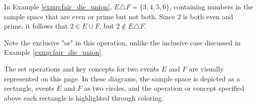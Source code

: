 \begin{exmp}
	In Example \autoref{exmp:fair_die_union}, \( E \triangle F = \{ 3, 4, 5, 6 \} \),
	containing numbers in the sample space that are even or prime but not both.
	Since 2 is both even and prime, it follows that \( 2 \in E \cup F \), but \( 2 \not\in E \triangle F \).

	Note the exclusive "or" in this operation, unlike the inclusive case discussed in Example \autoref{exmp:fair_die_union}.
\end{exmp}

\newpage

The set operations and key concepts for two events \( E \) and \( F \) are visually represented on this page.
In these diagrams, the sample space is depicted as a rectangle,
events \( E \) and \( F \) as two circles,
and the operation or concept specified above each rectangle is highlighted through coloring.

